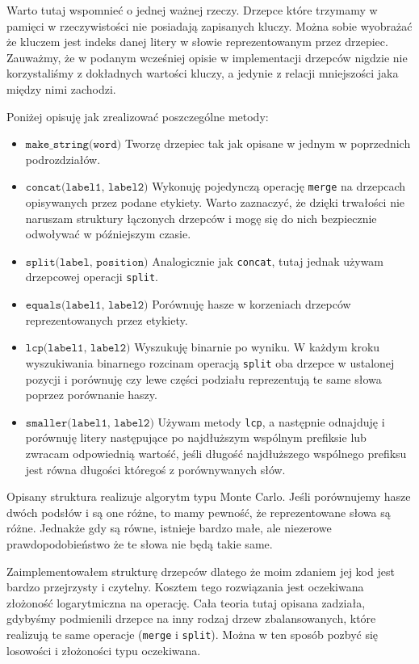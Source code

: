 \documentclass[declaration,shortabstract]{iithesis}
\theoremstyle{definition} \newtheorem{definition}{Definicja}[chapter]
\theoremstyle{remark} \newtheorem{remark}[definition]{Obserwacja}
\theoremstyle{plain} \newtheorem{theorem}[definition]{Twierdzenie}
\theoremstyle{remark} \newtheorem{example}{Przykład}[definition]
\theoremstyle{plain} \newtheorem{lemma}[definition]{Lemat}
\begin{document}
Warto tutaj wspomnieć o jednej ważnej rzeczy. Drzepce które trzymamy w pamięci w rzeczywistości nie posiadają zapisanych kluczy. Można sobie wyobrażać że kluczem jest indeks danej litery w słowie reprezentowanym przez drzepiec. Zauważmy, że w podanym wcześniej opisie w implementacji drzepców nigdzie nie korzystaliśmy z dokładnych wartości kluczy, a jedynie z relacji mniejszości jaka między nimi zachodzi.

Poniżej opisuję jak zrealizować poszczególne metody:
\begin{itemize}
    \item $\texttt{make\_string(word)}$ Tworzę drzepiec tak jak opisane w jednym w poprzednich podrozdziałów.
    \item $\texttt{concat(label1, label2)}$ Wykonuję pojedynczą operację \texttt{merge} na drzepcach opisywanych przez podane etykiety. Warto zaznaczyć, że dzięki trwałości nie naruszam struktury łączonych drzepców i mogę się do nich bezpiecznie odwoływać w późniejszym czasie.
    \item $\texttt{split(label, position)}$ Analogicznie jak \texttt{concat}, tutaj jednak używam drzepcowej operacji \texttt{split}.
    \item $\texttt{equals(label1, label2)}$ Porównuję hasze w korzeniach drzepców reprezentowanych przez etykiety.
    \item $\texttt{lcp(label1, label2)}$ Wyszukuję binarnie po wyniku. W każdym kroku wyszukiwania binarnego rozcinam operacją \texttt{split} oba drzepce w ustalonej pozycji i porównuję czy lewe części podziału reprezentują te same słowa poprzez porównanie haszy.
    \item $\texttt{smaller(label1, label2)}$ Używam metody \texttt{lcp}, a następnie odnajduję i porównuję litery następujące po najdłuższym wspólnym prefiksie lub zwracam odpowiednią wartość, jeśli długość najdłuższego wspólnego prefiksu jest równa długości któregoś z porównywanych słów.
\end{itemize}

Opisany struktura realizuje algorytm typu Monte Carlo. Jeśli porównujemy hasze dwóch podsłów i są one różne, to mamy pewność, że reprezentowane słowa są różne. Jednakże gdy są równe, istnieje bardzo małe, ale niezerowe prawdopodobieństwo że te słowa nie będą takie same.

Zaimplementowałem strukturę drzepców dlatego że moim zdaniem jej kod jest bardzo przejrzysty i czytelny. Kosztem tego rozwiązania jest oczekiwana złożoność logarytmiczna na operację. Cała teoria tutaj opisana zadziała, gdybyśmy podmienili drzepce na inny rodzaj drzew zbalansowanych, które realizują te same operacje (\texttt{merge} i \texttt{split}). Można w ten sposób pozbyć się losowości i złożoności typu oczekiwana.
\end{document}

